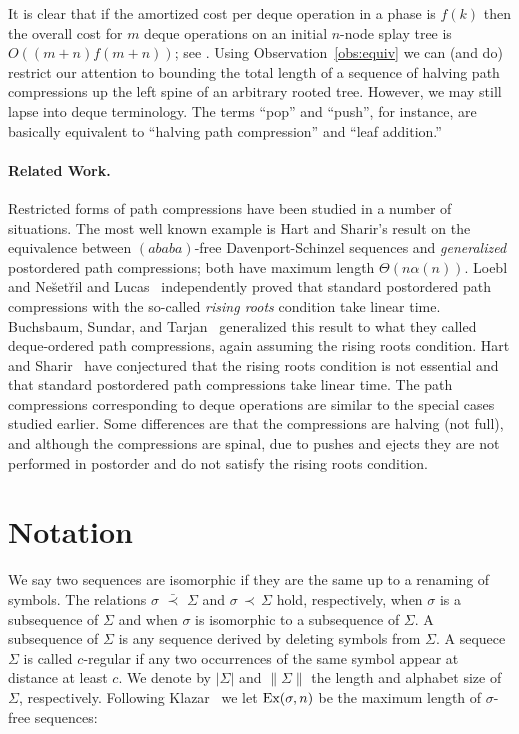 \documentclass{article}
\newcommand{\Nesetril}{Ne{\u{s}}et{\u{r}}il}
\newcommand{\Ex}{\mbox{\rm Ex}}
\newcommand{\subseq}{\,\prec\,}
\newcommand{\subseqe}{\,\bar{\subseq}\,}
\begin{document}
It is clear that if the amortized cost per deque operation in a phase is $f(k)$ then the overall cost for $m$ deque operations
on an initial $n$-node splay tree is $O((m+n)f(m+n))$; see \cite{Tar85,Sundar92,Elmasry04b}.
Using Observation~\ref{obs:equiv} we can (and do) restrict our attention to bounding the total length of a sequence of halving path
compressions up the left spine of an arbitrary rooted tree.  However, we may still lapse into deque terminology.  The terms
``pop'' and ``push'', for instance, are basically equivalent to ``halving path compression'' and ``leaf addition.''

\paragraph{Related Work.}
Restricted forms of path compressions have been studied in a number of situations.
The most well known example is Hart and Sharir's result \cite{HS86} on the equivalence between
$(ababa)$-free Davenport-Schinzel sequences and {\em generalized} postordered path compressions;
both have maximum length $\Theta(n\alpha(n))$.  Loebl and \Nesetril{} \cite{LN97} and Lucas~\cite{Lucas90} independently proved
that standard postordered path compressions with the so-called {\em rising roots} condition take linear time.
Buchsbaum, Sundar, and Tarjan~\cite{B+95} generalized this result to what they called deque-ordered path compressions,
again assuming the rising roots condition.  Hart and Sharir~\cite{HS86} have conjectured that the rising roots condition 
is not essential and that standard postordered path compressions take linear time.
The path compressions corresponding to deque operations 
are similar to the special cases studied earlier.  Some differences are that the compressions are halving (not full),
and although the compressions are spinal, due to pushes and ejects they are not performed in postorder
and do not satisfy the rising roots condition.




\section{Notation}\label{sect:not}

We say two sequences are isomorphic if they are the same up to a renaming of symbols.
The relations $\sigma \subseqe \Sigma$ and $\sigma \subseq \Sigma$ hold, respectively,
when $\sigma$ is a subsequence of $\Sigma$ and when $\sigma$ is isomorphic to a subsequence
of $\Sigma$.  A subsequence of $\Sigma$ is any sequence derived by deleting symbols from $\Sigma$.
A sequece $\Sigma$ is called $c$-regular if any two occurrences of the same symbol appear at distance at least $c$.
We denote by $|\Sigma|$ and $\|\Sigma\|$ the length and alphabet size of $\Sigma$, respectively.
Following Klazar~\cite{Klazar02} we let $\Ex(\sigma,n)$ be the maximum length of $\sigma$-free sequences:
\end{document}
